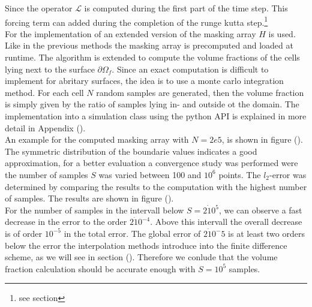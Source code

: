Since the operator $\mathscr{L}$ is computed during the first part of the time step. This forcing term can added during the completion of the runge kutta step.\footnote{see section}\\
For the implementation of an extended version of the masking array $H$ is used.
Like in the previous methods the masking array is precomputed and loaded at runtime. The algorithm is extended to compute the
volume fractions of the cells lying next to the surface $\partial\Omega_f$.
Since an exact computation is difficult to implement for abritary surfaces, the idea is to use a monte carlo integration method.
For each cell $N$ random samples are generated, then the volume fraction is simply given by the ratio of samples lying in- and outside ot the domain.
The implementation into a simulation class using the python API is explained in more detail in Appendix ().\\
An example for the computed masking array with $N=2e5$, is shown in figure (). The symmetric distribution of the boundarie values indicates
a good approximation, for a better evaluation a convergence study was performed were the number of samples $S$ was varied between 100 and $10^6$ points.
The $l_2$-error was determined by comparing the results to the computation with the highest number of samples.
The results are shown in figure ().\\
For the number of samples in the intervall below $S=2\dot10^5$, we can observe a fast decrease in the error to the order $2\dot10^{-4}$.
Above this intervall the overall decrease is of order $10^{-5}$ in the total error.
The global error of $2\dot10^-5$ is at least two orders below the error the interpolation methods introduce into the finite difference scheme, as we will see
in section (). Therefore we conlude that the volume fraction calculation should be accurate enough with $S=10^5$ samples.\\


